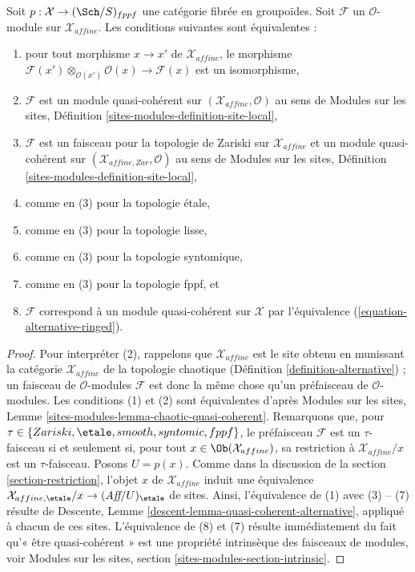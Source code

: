 \begin{lemma}
\label{lemma-quasi-coherent-alternative}
Soit $p : \mathcal{X} \to (\Sch/S)_{fppf}$ une catégorie fibrée en groupoïdes.
Soit $\mathcal{F}$ un $\mathcal{O}$-module sur $\mathcal{X}_{affine}$.
Les conditions suivantes sont équivalentes :
\begin{enumerate}
\item pour tout morphisme $x \to x'$ de $\mathcal{X}_{affine}$, le morphisme
$\mathcal{F}(x') \otimes_{\mathcal{O}(x')} \mathcal{O}(x) \to \mathcal{F}(x)$
est un isomorphisme,
\item $\mathcal{F}$ est un module quasi-cohérent sur
$(\mathcal{X}_{affine}, \mathcal{O})$ au sens de
Modules sur les sites, Définition \ref{sites-modules-definition-site-local},
\item $\mathcal{F}$ est un faisceau pour la topologie de Zariski sur
$\mathcal{X}_{affine}$ et un module quasi-cohérent sur
$(\mathcal{X}_{affine, Zar}, \mathcal{O})$ au sens de
Modules sur les sites, Définition \ref{sites-modules-definition-site-local},
\item comme en (3) pour la topologie \'etale,
\item comme en (3) pour la topologie lisse,
\item comme en (3) pour la topologie syntomique,
\item comme en (3) pour la topologie fppf, et
\item $\mathcal{F}$ correspond à un module quasi-cohérent
sur $\mathcal{X}$ par l'équivalence (\ref{equation-alternative-ringed}).
\end{enumerate}
\end{lemma}

\begin{proof}
Pour interpréter (2), rappelons que $\mathcal{X}_{affine}$ est le site
obtenu en munissant la catégorie $\mathcal{X}_{affine}$ de la topologie
chaotique (Définition \ref{definition-alternative}) ; un faisceau
de $\mathcal{O}$-modules $\mathcal{F}$ est donc la même chose qu'un
préfaisceau de $\mathcal{O}$-modules. Les conditions (1) et (2)
sont équivalentes d'après Modules sur les sites, Lemme
\ref{sites-modules-lemma-chaotic-quasi-coherent}.
Remarquons que, pour $\tau \in \{Zariski, \etale, smooth, syntomic, fppf\}$,
le préfaisceau $\mathcal{F}$ est un $\tau$-faisceau si et seulement si,
pour tout $x \in \Ob(\mathcal{X}_{affine})$, sa restriction
à $\mathcal{X}_{affine}/x$ est un $\tau$-faisceau. Posons $U = p(x)$.
Comme dans la discussion de la section \ref{section-restriction},
l'objet $x$ de $\mathcal{X}_{affine}$ induit une équivalence
$\mathcal{X}_{affine, \etale}/x \to (\textit{Aff}/U)_\etale$ de sites.
Ainsi, l'équivalence de (1) avec (3) -- (7)
résulte de Descente, Lemme \ref{descent-lemma-quasi-coherent-alternative},
appliqué à chacun de ces sites. L'équivalence de (8) et (7)
résulte immédiatement du fait qu'« être quasi-cohérent » est une
propriété intrinsèque des faisceaux de modules, voir
Modules sur les sites, section \ref{sites-modules-section-intrinsic}.
\end{proof}

